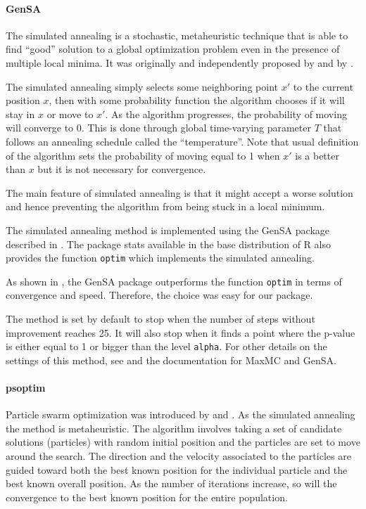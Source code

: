 \documentclass[]{article}\usepackage[]{graphicx}\usepackage[]{color}
\newcommand{\pkg}[1]{{\normalfont\fontseries{b}\selectfont #1}}
\let\proglang=\textsf
\let\code=\texttt
\begin{document}
	\paragraph{GenSA}

	The simulated annealing is a stochastic, metaheuristic technique that is able to find ``good'' solution to a global optimization problem even in the presence of multiple local minima. It was originally and independently proposed by \cite{kirkpatrick_optimization_1983} and by \cite{cerny_thermodynamical_1985}.

	The simulated annealing simply selects some neighboring point $x'$ to the current position $x$, then with some probability function the algorithm chooses if it will stay in $x$ or move to $x'$. As the algorithm progresses, the probability of moving will converge to 0. This is done through global time-varying parameter $T$ that follows an annealing schedule called the ``temperature''.  Note that usual definition of the algorithm sets the probability of moving equal to 1 when $x'$ is a better than $x$ but it is not necessary for convergence.

	The main feature of simulated annealing is that it might accept a worse solution and hence preventing the algorithm from being stuck in a local minimum.

	The simulated annealing method is implemented using the \pkg{GenSA} package described in \cite{yang_xiang_generalized_2013}. The package \pkg{stats} available in the base distribution of \proglang{R} also provides the function \code{optim} which implements the simulated annealing.

	As shown in \cite{mullen_continuous_2014}, the \pkg{GenSA} package outperforms the function \code{optim} in terms of convergence and speed. Therefore, the choice was easy for our package.

	The method is set by default to stop when the number of steps without improvement reaches 25. It will also stop when it finds a point where the p-value is either equal to 1 or bigger than the level \code{alpha}. For other details on the settings of this method, see \cite{yang_xiang_generalized_2013} and the documentation for \pkg{MaxMC} and \pkg{GenSA}.



	\paragraph{psoptim}


	Particle swarm optimization was introduced by \cite{eberhart_new_1995} and \cite{shi_modified_1998}. As the simulated annealing the method is metaheuristic. The algorithm involves taking a set of candidate solutions (particles) with random initial position and the particles are set to move around the search. The direction and the velocity associated to the particles are guided toward both the best known position for the individual particle and the best known overall position. As the number of iterations increase, so will the convergence to the best known position for the entire population.
\end{document}
